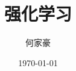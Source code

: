 \documentclass[aspectratio=169,xcolor=dvipsnames]{beamer}
\title{强化学习}
\author{何家豪}
\institute
{
    hejiahao@ruc.edu.cn \\
    中国人民大学信息学院
}
\date{\today}
\begin{document}
\begin{frame}
    \titlepage
\end{frame}








\end{document}
